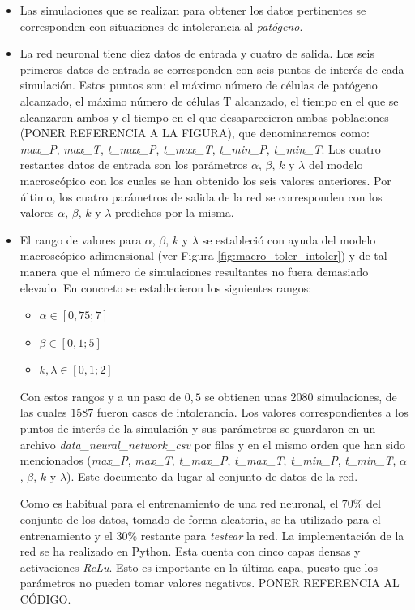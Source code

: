 \begin{itemize}
	\item Las simulaciones que se realizan para obtener los datos pertinentes se corresponden con situaciones de intolerancia al \textit{patógeno}.
	
	\item La red neuronal tiene diez datos de entrada y cuatro de salida. Los seis primeros datos de entrada se corresponden con seis puntos de interés de cada simulación. Estos puntos son: el máximo número de células de patógeno alcanzado, el máximo número de células T alcanzado, el tiempo en el que se alcanzaron ambos y el tiempo en el que desaparecieron ambas poblaciones (PONER REFERENCIA A LA FIGURA), que denominaremos como: \textit{max\_P}, \textit{max\_T}, \textit{t\_max\_P}, \textit{t\_max\_T}, \textit{t\_min\_P}, \textit{t\_min\_T}. Los cuatro restantes datos de entrada son los parámetros $\alpha$, $\beta$, $k$ y $\lambda$ del modelo macroscópico con los cuales se han obtenido los seis valores anteriores. Por último, los cuatro parámetros de salida de la red se corresponden con los valores $\alpha$, $\beta$, $k$ y $\lambda$ predichos por la misma.
	
	\item El rango de valores para $\alpha$, $\beta$, $k$ y $\lambda$ se estableció con ayuda del modelo macroscópico adimensional (ver Figura \ref{fig:macro_toler_intoler}) y de tal manera que el número de simulaciones resultantes no fuera demasiado elevado. En concreto se establecieron los siguientes rangos:
	
	\begin{itemize}
		\item $\alpha \in  [0,75;7]$
		\item $\beta \in [0,1;5]$
		\item $k, \lambda \in [0,1;2]$
	\end{itemize}
	
	Con estos rangos y a un paso de $0,5$ se obtienen unas $2080$ simulaciones, de las cuales $1587$ fueron casos de intolerancia. Los valores correspondientes a los puntos de interés de la simulación y sus parámetros se guardaron en un archivo \textit{data\_neural\_network\_csv} por filas y en el mismo orden que han sido mencionados (\textit{max\_P}, \textit{max\_T}, \textit{t\_max\_P}, \textit{t\_max\_T}, \textit{t\_min\_P}, \textit{t\_min\_T}, $\alpha$, $\beta$, $k$ y $\lambda$). Este documento da lugar al conjunto de datos de la red.
	
	Como es habitual para el entrenamiento de una red neuronal, el $70\%$ del conjunto de los datos, tomado de forma aleatoria, se ha utilizado para el entrenamiento y el $30\%$ restante para \textit{testear} la red. La implementación de la red se ha realizado en Python. Esta cuenta con cinco capas densas y activaciones \textit{ReLu}. Esto es importante en la última capa, puesto que los parámetros no pueden tomar valores negativos. PONER REFERENCIA AL CÓDIGO.
	
\end{itemize}


